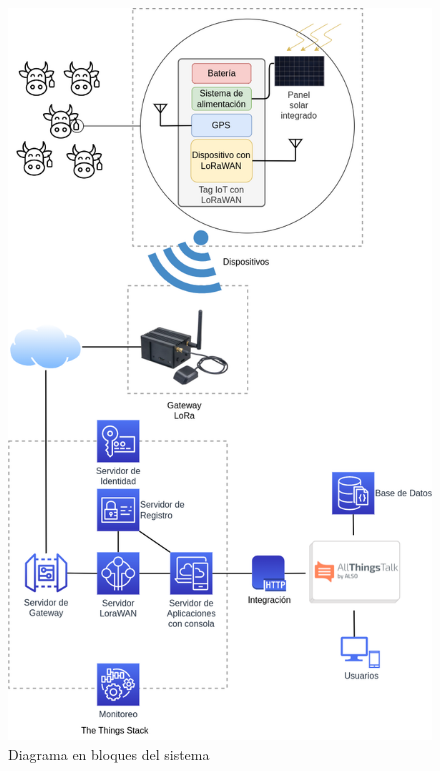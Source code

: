 \documentclass[
11pt, %
]{charter}
\begin{document}
\begin{figure}[htpb]
\centering 
\includegraphics[width=.7\textwidth]{./Figuras/diagBloques.png}
\caption{Diagrama en bloques del sistema}
\label{fig:diagBloques}
\end{figure}
\end{document}

